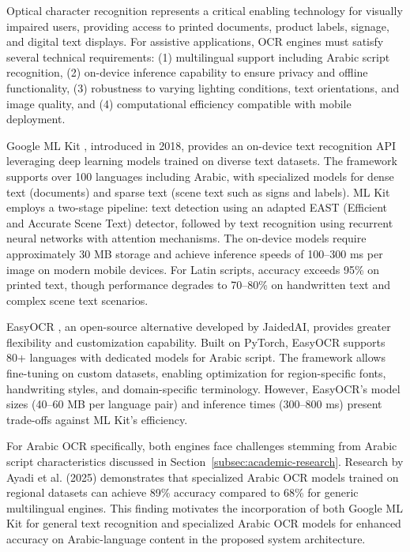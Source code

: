 \documentclass[a4paper]{report}
\begin{document}
Optical character recognition represents a critical enabling technology for visually impaired users, providing access to printed documents, product labels, signage, and digital text displays. For assistive applications, OCR engines must satisfy several technical requirements: (1) multilingual support including Arabic script recognition, (2) on-device inference capability to ensure privacy and offline functionality, (3) robustness to varying lighting conditions, text orientations, and image quality, and (4) computational efficiency compatible with mobile deployment.

Google ML Kit \cite{google_mlkit}, introduced in 2018, provides an on-device text recognition API leveraging deep learning models trained on diverse text datasets. The framework supports over 100 languages including Arabic, with specialized models for dense text (documents) and sparse text (scene text such as signs and labels). ML Kit employs a two-stage pipeline: text detection using an adapted EAST (Efficient and Accurate Scene Text) detector, followed by text recognition using recurrent neural networks with attention mechanisms. The on-device models require approximately 30 MB storage and achieve inference speeds of 100--300 ms per image on modern mobile devices. For Latin scripts, accuracy exceeds 95\% on printed text, though performance degrades to 70--80\% on handwritten text and complex scene text scenarios.

EasyOCR \cite{easyocr}, an open-source alternative developed by JaidedAI, provides greater flexibility and customization capability. Built on PyTorch, EasyOCR supports 80+ languages with dedicated models for Arabic script. The framework allows fine-tuning on custom datasets, enabling optimization for region-specific fonts, handwriting styles, and domain-specific terminology. However, EasyOCR's model sizes (40--60 MB per language pair) and inference times (300--800 ms) present trade-offs against ML Kit's efficiency.

For Arabic OCR specifically, both engines face challenges stemming from Arabic script characteristics discussed in Section~\ref{subsec:academic-research}. Research by Ayadi et al. (2025) \cite{ayadi2025arabic} demonstrates that specialized Arabic OCR models trained on regional datasets can achieve 89\% accuracy compared to 68\% for generic multilingual engines. This finding motivates the incorporation of both Google ML Kit for general text recognition and specialized Arabic OCR models for enhanced accuracy on Arabic-language content in the proposed system architecture.
\end{document}
